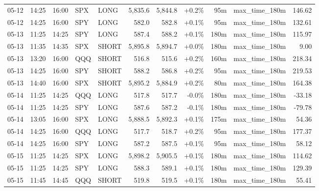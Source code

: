 \documentclass[11pt,a4paper,twoside]{article}
\begin{document}
\begin{center}
\begin{longtable}{>{\color{txtmain}}l l l l l r r r r >{\color{txtmain}}l r}
05-12 & 14:25 & 16:00 & SPX & LONG & 5,835.6 & 5,844.8 & \textcolor{wingreen}{+0.2\%} & 95m & max\_time\_180m & \textcolor{wingreen}{146.62} \\
05-12 & 14:25 & 16:00 & SPY & LONG & 582.0 & 582.8 & \textcolor{wingreen}{+0.1\%} & 95m & max\_time\_180m & \textcolor{wingreen}{132.61} \\
05-13 & 11:25 & 14:25 & SPY & LONG & 587.4 & 588.2 & \textcolor{wingreen}{+0.1\%} & 180m & max\_time\_180m & \textcolor{wingreen}{115.97} \\
05-13 & 11:35 & 14:35 & SPX & SHORT & 5,895.8 & 5,894.7 & \textcolor{wingreen}{+0.0\%} & 180m & max\_time\_180m & \textcolor{wingreen}{9.00} \\
05-13 & 13:20 & 16:00 & QQQ & SHORT & 516.8 & 515.6 & \textcolor{wingreen}{+0.2\%} & 160m & max\_time\_180m & \textcolor{wingreen}{218.34} \\
05-13 & 14:25 & 16:00 & SPY & SHORT & 588.2 & 586.8 & \textcolor{wingreen}{+0.2\%} & 95m & max\_time\_180m & \textcolor{wingreen}{219.53} \\
05-13 & 14:40 & 16:00 & SPX & SHORT & 5,895.2 & 5,884.9 & \textcolor{wingreen}{+0.2\%} & 80m & max\_time\_180m & \textcolor{wingreen}{164.38} \\
05-14 & 11:25 & 14:25 & QQQ & LONG & 517.8 & 517.7 & \textcolor{lossred}{-0.0\%} & 180m & max\_time\_180m & \textcolor{lossred}{-33.18} \\
05-14 & 11:25 & 14:25 & SPY & LONG & 587.6 & 587.2 & \textcolor{lossred}{-0.1\%} & 180m & max\_time\_180m & \textcolor{lossred}{-79.78} \\
05-14 & 13:05 & 16:00 & SPX & LONG & 5,888.5 & 5,892.3 & \textcolor{wingreen}{+0.1\%} & 175m & max\_time\_180m & \textcolor{wingreen}{54.36} \\
05-14 & 14:25 & 16:00 & QQQ & LONG & 517.7 & 518.7 & \textcolor{wingreen}{+0.2\%} & 95m & max\_time\_180m & \textcolor{wingreen}{177.37} \\
05-14 & 14:25 & 16:00 & SPY & LONG & 587.2 & 587.5 & \textcolor{wingreen}{+0.1\%} & 95m & max\_time\_180m & \textcolor{wingreen}{58.12} \\
05-15 & 11:25 & 14:25 & SPX & LONG & 5,898.2 & 5,905.5 & \textcolor{wingreen}{+0.1\%} & 180m & max\_time\_180m & \textcolor{wingreen}{114.62} \\
05-15 & 11:25 & 14:25 & SPY & LONG & 588.3 & 589.1 & \textcolor{wingreen}{+0.1\%} & 180m & max\_time\_180m & \textcolor{wingreen}{129.39} \\
05-15 & 11:45 & 14:45 & QQQ & SHORT & 519.8 & 519.5 & \textcolor{wingreen}{+0.1\%} & 180m & max\_time\_180m & \textcolor{wingreen}{55.41} \\

\end{longtable}
\end{center}
\end{document}
